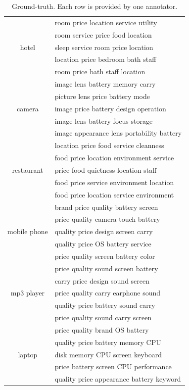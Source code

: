 	\begin{table}[th]
		\small
		\centering
		\caption{Ground-truth. Each row is provided by one annotator.}
		\label{table:labels}
		\begin{tabular}{|c|l|}
			\hline
			\multirow{5}{*}{hotel}
			& room price location service utility \\
			& room service price food location  \\
			& sleep service room price location  \\
			& location price bedroom bath staff  \\
			& room price bath staff location  \\\hline
			
			\multirow{5}{*}{camera}
			& image lens battery memory carry \\
			& picture lens price battery mode \\
			& image price battery design operation \\
			& image lens battery focus storage \\
			& image appearance lens portability battery \\\hline
			
			\multirow{5}{*}{restaurant}
			& location price food service cleanness \\
			& food price location environment service \\
			& price food quietness location staff \\
			& food price service environment location \\
			& food price location service environment \\\hline
			
			\multirow{5}{*}{mobile phone}
			& brand price quality battery screen \\
			& price quality camera touch battery \\
			& quality price design screen carry \\
			& quality price OS battery service \\
			& price quality screen battery color \\\hline
			
			\multirow{5}{*}{mp3 player}
			& price quality sound screen battery \\
			& carry price design sound screen  \\ 
			& price quality carry earphone sound \\
			& quality price battery sound carry \\
			& price quality sound carry screen
			 \\\hline
			
			\multirow{5}{*}{laptop}
			& price quality brand OS battery \\
			& quality price battery memory CPU \\
			& disk memory CPU screen keyboard \\
			& price battery screen CPU performance \\ 
			& quality price appearance battery keyword \\\hline
			\end{tabular}
		\end{table}

